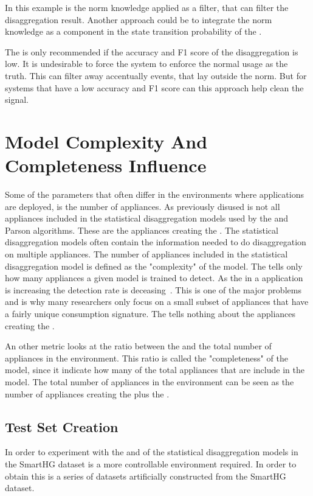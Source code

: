 In this example is the norm knowledge applied as a filter, that can filter the disaggregation result. Another approach could be to integrate the norm knowledge as a component in the state transition probability of the .

The  is only recommended if the accuracy and F1 score of the disaggregation is low. It is undesirable to force the system to enforce the normal usage as the truth. This can filter away accentually events, that lay outside the norm. But for systems that have a low accuracy and F1 score can this approach help clean the signal. 

\section{Model Complexity And Completeness Influence }
\label{sec:MCACI}
Some of the parameters that often differ in the environments where applications are deployed, is the number of appliances. As previously disused is not all appliances included in the statistical disaggregation models used by the  and Parson algorithms. These are the appliances creating the . The statistical disaggregation models often contain the information needed to do disaggregation on multiple appliances. The number of appliances included in the statistical disaggregation model is defined as the "complexity" of the model. The  tells only how many appliances a given model is trained to detect. As the  in a  application is increasing the detection rate is deceasing~\citep{RefWorks:34}. This is one of the major problems and is why many researchers only focus on a small subset of appliances that have a fairly unique consumption signature. The  tells nothing about the appliances creating the . 

An other metric looks at the ratio between the  and the total number of appliances in the environment. This ratio is called the "completeness" of the model, since it indicate how many of the total appliances that are include in the model. The total number of appliances in the environment can be seen as the number of appliances creating the  plus the .


\subsection{Test Set Creation}
\label{sec:datasetCreation}
In order to experiment with the  and  of the statistical disaggregation models in the SmartHG dataset is a more controllable environment required. In order to obtain this is a series of datasets artificially constructed from the SmartHG dataset. 

